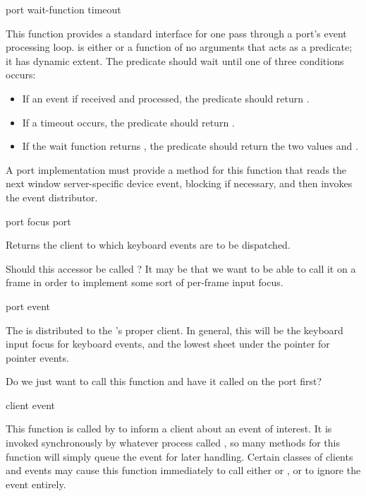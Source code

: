  {port \key wait-function timeout}

This function provides a standard interface for one pass through a port's event
processing loop.   is either  or a function of no
arguments that acts as a predicate; it has dynamic extent.  The predicate should
wait until one of three conditions occurs:

\begin{itemize}
\item If an event if received and processed, the predicate should return
.

\item If a timeout occurs, the predicate should return .

\item If the wait function returns , the predicate should return the
two values  and .
\end{itemize}

A port implementation must provide a method for this function that reads the
next window server-specific device event, blocking if necessary, and then
invokes the event distributor.

 {port}
 {focus port}

Returns the client to which keyboard events are to be dispatched.

 {Should this accessor be called ?  It may
be that we want to be able to call it on a frame in order to implement some sort
of per-frame input focus.}

 {port event}

The  is distributed to the 's proper client.  In general,
this will be the keyboard input focus for keyboard events, and the lowest sheet
under the pointer for pointer events.

 {Do we just want to call this function  and have
it called on the port first?}

 {client event}

This function is called by  to inform a client about an
event of interest.  It is invoked synchronously by whatever process called
, so many methods for this function will simply queue the
event for later handling.  Certain classes of clients and events may cause this
function immediately to call either  or , or to
ignore the event entirely.

